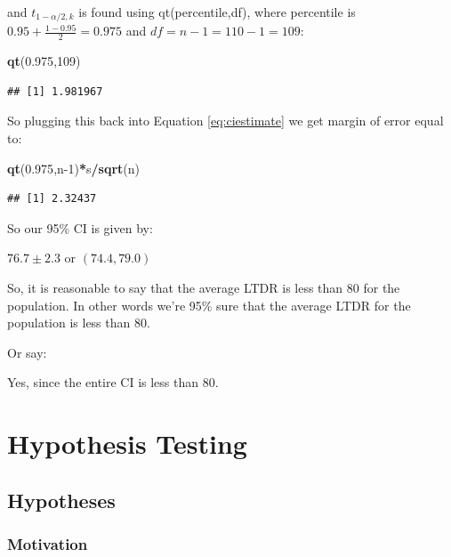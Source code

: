 \documentclass[
  openany]{book}
\newenvironment{Shaded}{\begin{snugshade}}{\end{snugshade}}
\newcommand{\DecValTok}[1]{\textcolor[rgb]{0.00,0.00,0.81}{#1}}
\newcommand{\FloatTok}[1]{\textcolor[rgb]{0.00,0.00,0.81}{#1}}
\newcommand{\FunctionTok}[1]{\textcolor[rgb]{0.13,0.29,0.53}{\textbf{#1}}}
\newcommand{\NormalTok}[1]{#1}
\newcommand{\SpecialCharTok}[1]{\textcolor[rgb]{0.81,0.36,0.00}{\textbf{#1}}}
\begin{document}
and \(t_{1-\alpha/2,k}\) is found using qt(percentile,df), where percentile is \(0.95+\frac{1-0.95}{2} = 0.975\) and \(df=n-1=110-1=109\):

\begin{Shaded}
\begin{Highlighting}[]
\FunctionTok{qt}\NormalTok{(}\FloatTok{0.975}\NormalTok{,}\DecValTok{109}\NormalTok{)}
\end{Highlighting}
\end{Shaded}

\begin{verbatim}
## [1] 1.981967
\end{verbatim}

So plugging this back into Equation \eqref{eq:ciestimate} we get margin of error equal to:

\begin{Shaded}
\begin{Highlighting}[]
\FunctionTok{qt}\NormalTok{(}\FloatTok{0.975}\NormalTok{,n}\DecValTok{{-}1}\NormalTok{)}\SpecialCharTok{*}\NormalTok{s}\SpecialCharTok{/}\FunctionTok{sqrt}\NormalTok{(n)}
\end{Highlighting}
\end{Shaded}

\begin{verbatim}
## [1] 2.32437
\end{verbatim}

So our 95\% CI is given by:

\(76.7\pm 2.3\) or \((74.4,79.0)\)

So, it is reasonable to say that the average LTDR is less than 80 for the population. In other words we're 95\% sure that the average LTDR for the population is less than 80.

Or say:

Yes, since the entire CI is less than 80.

\newpage

\section{Hypothesis Testing}\label{hypothesis-testing}

\subsection{Hypotheses}\label{hypotheses}

\subsubsection{Motivation}\label{motivation-1}
\end{document}
